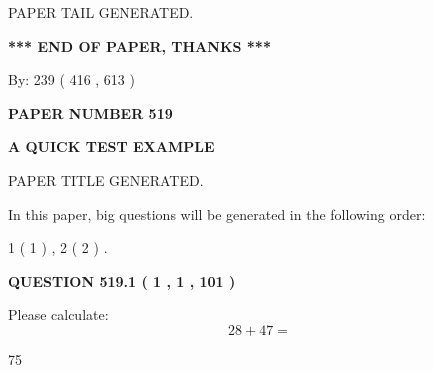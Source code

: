 \documentclass[12pt]{article}
\begin{document}
\vspace{2.0in} PAPER TAIL GENERATED.
   
   
   
   
\vspace{1.0in} 
{\textbf{\large{ *** END OF PAPER, THANKS *** }}} 
   
   
\hspace{1.0in} By: 
 239 ( 416 ,  613 )
   
   
   
   
\newpage 
\setcounter{page}{ 
   519001 } 
   
   
   
   
 {\textbf{ \Large{ PAPER NUMBER  519  }}}
   
   
\vspace{0.2in}
   
   
   
   
   
   
   
   
 \vspace{0.2in}
{\LARGE {\textbf{ A QUICK TEST EXAMPLE}}}
   
   
 PAPER TITLE GENERATED.
   
   
   
\vspace{0.2in}
   
In this paper, big questions will be generated in the following order: 
   
   
   1 ( 1 )
 ,
   2 ( 2 )
 .
  
\vspace{0.2in}
  
{\textbf{\Large{QUESTION
519.1 
 ( 1 , 1 , 101 )
}}}
  
  
 
Please calculate:
\begin{equation}
28 +  %
47 = \nonumber
\end{equation}
 
 
 
\noindent{}
 
 

75
 
 
\noindent{}
 
 

 
 
\end{document}
